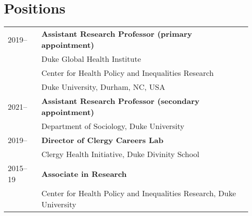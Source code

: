 \vspace{3ex}
\section*{Positions}
\begin{longtable}{p{} p{}}
2019-- & \textbf{Assistant Research Professor (primary appointment)}\\
		             & Duke Global Health Institute\\
		             & Center for Health Policy and Inequalities Research\\
		             &Duke University, Durham, NC, USA \\
		             
		             2021-- & \textbf{Assistant Research Professor (secondary appointment)}\\
		             & Department of Sociology, Duke University \\
		             
  		             2019--  & \textbf{Director of Clergy Careers Lab}\\
  		             & Clergy Health Initiative, Duke Divinity School\\
		             
2015--19 & \textbf{Associate in Research}\\
& Center for Health Policy and Inequalities Research, Duke University\\
\end{longtable}
